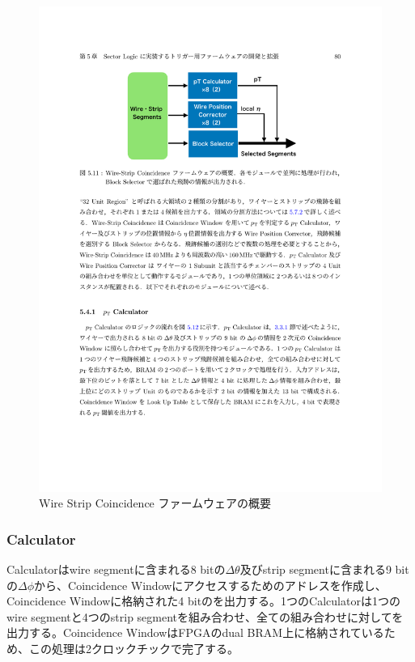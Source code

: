 \begin{figure} 
\centering
\includegraphics[width=16cm]{fig/SL/WS_logic.pdf}
\caption[Wire Strip Coincidence ファームウェアの概要]{Wire Strip Coincidence ファームウェアの概要\cite{mt_kawamoto}}
\label{WS_logic}
\end{figure}

\subsubsection*{\pt Calculator}
\pt Calculatorはwire segmentに含まれる8 bitの$\Delta\theta$及びstrip segmentに含まれる9 bitの$\Delta\phi$から、Coincidence Windowにアクセスするためのアドレスを作成し、Coincidence Windowに格納された4 bitの\pt を出力する。1つの\pt Calculatorは1つのwire segmentと4つのstrip segmentを組み合わせ、全ての組み合わせに対して\pt を出力する。Coincidence WindowはFPGAのdual BRAM上に格納されているため、この処理は2クロックチックで完了する。

